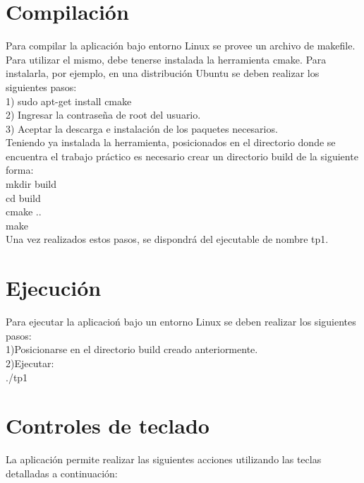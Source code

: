 \documentclass[11pt]{article}
\begin{document}
\newpage

\section{Compilaci\'on}
  Para compilar la aplicaci\'on bajo entorno Linux se provee un archivo de makefile.
  Para utilizar el mismo, debe tenerse instalada la herramienta cmake. Para instalarla, por ejemplo, en una distribuci\'on Ubuntu se deben 
realizar los siguientes pasos: \\
1) sudo apt-get install cmake \\
2) Ingresar la contrase\~na de root del usuario. \\
3) Aceptar la descarga e instalaci\'on de los paquetes necesarios. \\ 

Teniendo ya instalada la herramienta, posicionados en el directorio donde se encuentra el trabajo pr\'actico es necesario crear un directorio build
de la siguiente forma: \\
mkdir build \\
cd build \\
cmake .. \\
make \\

Una vez realizados estos pasos, se dispondr\'a del ejecutable de nombre tp1.

\section{Ejecuci\'on}

Para ejecutar la aplicacio\'n bajo un entorno Linux se deben realizar los siguientes pasos: \\
1)Posicionarse en el directorio build creado anteriormente. \\
2)Ejecutar: \\
./tp1 

\newpage
\section{Controles de teclado}

La aplicaci\'on permite realizar las siguientes acciones utilizando las teclas detalladas a continuaci\'on: \\
\end{document}
